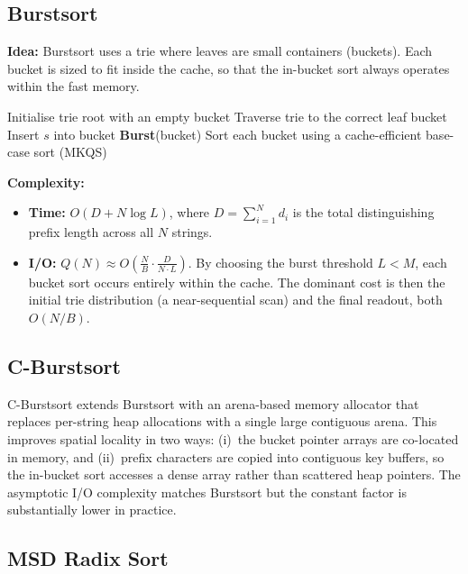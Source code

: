 \documentclass{article}
\begin{document}
\subsection{Burstsort}

\textbf{Idea:} Burstsort uses a trie where leaves are small containers (buckets).
Each bucket is sized to fit inside the cache, so that the in-bucket sort always
operates within the fast memory.

\begin{algorithm}
\caption{Burstsort ($S,\,L$)}
\begin{algorithmic}[1]
\State Initialise trie root with an empty bucket
    \State Traverse trie to the correct leaf bucket
    \State Insert $s$ into bucket
     \textbf{Burst}(bucket) \EndIf
\EndFor
\State Sort each bucket using a cache-efficient base-case sort (MKQS)
\end{algorithmic}
\end{algorithm}

\textbf{Complexity:}
\begin{itemize}
  \item \textbf{Time:} $O(D + N \log L)$, where $D = \sum_{i=1}^{N} d_i$ is the
        total distinguishing prefix length across all $N$ strings.
  \item \textbf{I/O:} $Q(N) \approx O\!\left(\tfrac{N}{B} \cdot \tfrac{D}{N \cdot L}\right)$.
        By choosing the burst threshold $L < M$, each bucket sort occurs entirely
        within the cache.  The dominant cost is then the initial trie distribution
        (a near-sequential scan) and the final readout, both $O(N/B)$.
\end{itemize}

\subsection{C-Burstsort}

C-Burstsort extends Burstsort with an arena-based memory allocator that replaces
per-string heap allocations with a single large contiguous arena.  This improves
spatial locality in two ways: (i)~the bucket pointer arrays are co-located in
memory, and (ii)~prefix characters are copied into contiguous key buffers, so the
in-bucket sort accesses a dense array rather than scattered heap pointers.  The
asymptotic I/O complexity matches Burstsort but the constant factor is
substantially lower in practice.

\subsection{MSD Radix Sort}
\end{document}
